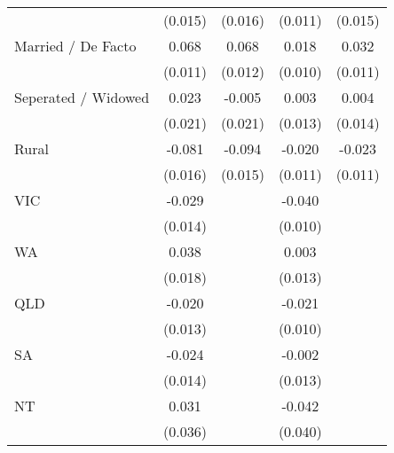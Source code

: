 {\begin{tabular}{l*{4}{c}}
                    &     (0.015)         &     (0.016)         &     (0.011)         &     (0.015)         \\
[1em]
Married / De Facto  &       0.068\sym{***}&       0.068\sym{***}&       0.018         &       0.032\sym{**} \\
                    &     (0.011)         &     (0.012)         &     (0.010)         &     (0.011)         \\
[1em]
Seperated / Widowed &       0.023         &      -0.005         &       0.003         &       0.004         \\
                    &     (0.021)         &     (0.021)         &     (0.013)         &     (0.014)         \\
[1em]
Rural               &      -0.081\sym{***}&      -0.094\sym{***}&      -0.020         &      -0.023\sym{*}  \\
                    &     (0.016)         &     (0.015)         &     (0.011)         &     (0.011)         \\
[1em]
VIC                 &      -0.029\sym{*}  &                     &      -0.040\sym{***}&                     \\
                    &     (0.014)         &                     &     (0.010)         &                     \\
[1em]
WA                  &       0.038\sym{*}  &                     &       0.003         &                     \\
                    &     (0.018)         &                     &     (0.013)         &                     \\
[1em]
QLD                 &      -0.020         &                     &      -0.021\sym{*}  &                     \\
                    &     (0.013)         &                     &     (0.010)         &                     \\
[1em]
SA                  &      -0.024         &                     &      -0.002         &                     \\
                    &     (0.014)         &                     &     (0.013)         &                     \\
[1em]
NT                  &       0.031         &                     &      -0.042         &                     \\
                    &     (0.036)         &                     &     (0.040)         &                     \\

\end{tabular}}
